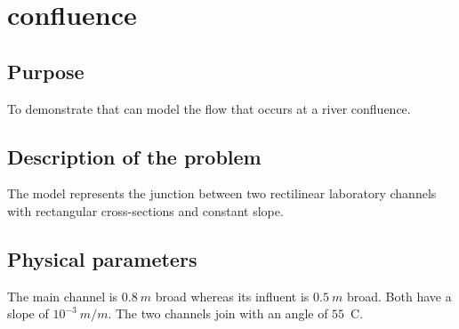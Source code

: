 \chapter{confluence}
%

%
\section{Purpose}
%
To demonstrate that  can model the flow that occurs at a river
confluence.
%
\section{Description of the problem}
%
The model represents the junction between two rectilinear laboratory channels
with rectangular cross-sections and constant slope.
%
%
%
%

%
%
\section{Physical parameters}
%
The main channel is $0.8~m$
broad whereas its influent is $0.5~m$ broad. Both have a slope of $10^{-3}~m/m$.
The two channels join with an angle of $55$~\degree{}C.
%
%
%
